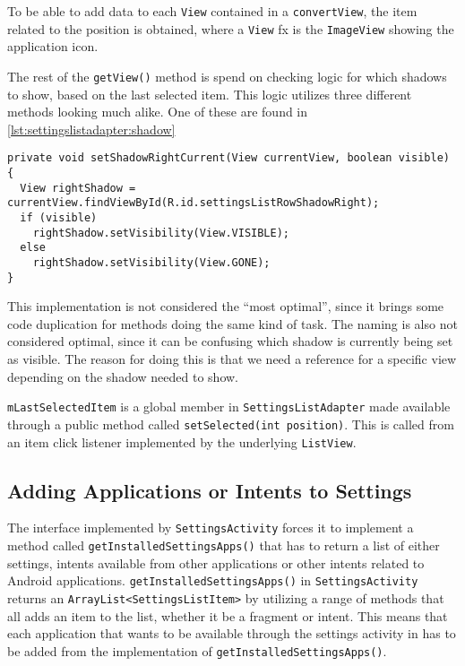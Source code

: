 To be able to add data to each \lstinline|View| contained in a \lstinline|convertView|, the item related to the position is obtained, where a \lstinline|View| fx is the \lstinline|ImageView| showing the application icon.

The rest of the \lstinline|getView()| method is spend on checking logic for which shadows to show, based on the last selected item.
This logic utilizes three different methods looking much alike.
One of these are found in \cref{lst:settingslistadapter:shadow}

\begin{lstlisting}[caption={One of three methods setting the visibility of shadows related to the selected list item.}, label={lst:settingslistadapter:shadow}]
private void setShadowRightCurrent(View currentView, boolean visible) {
  View rightShadow = currentView.findViewById(R.id.settingsListRowShadowRight);
  if (visible)
    rightShadow.setVisibility(View.VISIBLE);
  else
    rightShadow.setVisibility(View.GONE);
}
\end{lstlisting}

This implementation is not considered the ``most optimal'', since it brings some code duplication for methods doing the same kind of task.
The naming is also not considered optimal, since it can be confusing which shadow is currently being set as visible.
The reason for doing this is that we need a reference for a specific view depending on the shadow needed to show.

\lstinline|mLastSelectedItem| is a global member in \lstinline|SettingsListAdapter| made available through a public method called \lstinline|setSelected(int position)|.
This is called from an item click listener implemented by the underlying \lstinline|ListView|.


\subsection{Adding Applications or Intents to Settings}
The interface implemented by \lstinline|SettingsActivity| forces it to implement a method called \lstinline|getInstalledSettingsApps()| that has to return a list of either \launcher settings, intents available from other \giraf applications or other intents related to Android applications.
\lstinline|getInstalledSettingsApps()| in \lstinline|SettingsActivity| returns an \lstinline|ArrayList<SettingsListItem>| by utilizing a range of methods that all adds an item to the list, whether it be a fragment or intent.
This means that each \giraf application that wants to be available through the settings activity in \launcher has to be added from the implementation of \lstinline|getInstalledSettingsApps()|.


